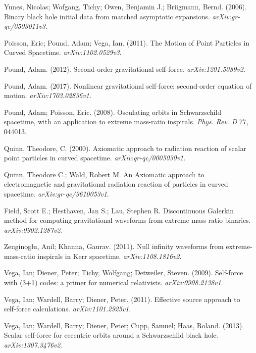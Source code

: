 Yunes, Nicolas; Wofgang, Tichy; Owen, Benjamin J.; Briigmann, Bernd. (2006). Binary black hole initial data from matched asymptotic expansions. {\em arXiv:gr-qc/0503011v3}.

Poisson, Eric; Pound, Adam; Vega, Ian. (2011). The Motion of Point Particles in Curved Spacetime. {\em arXiv:1102.0529v3}.

Pound, Adam. (2012). Second-order gravitational self-force. {\em arXiv:1201.5089v2}.

Pound, Adam. (2017). Nonlinear gravitational self-force: second-order equation of motion. {\em arXiv:1703.02836v1}.

Pound, Adam; Poisson, Eric. (2008). Osculating orbits in Schwarzschild spacetime, with an application to extreme mass-ratio inspirals. {\em Phys. Rev. D} 77, 044013.

Quinn, Theodore, C. (2000). Axiomatic approach to radiation reaction of scalar point particles in curved spacetime. {\em arXiv:qr-qc/0005030v1}.

Quinn, Theodore C.; Wald, Robert M. An Axiomatic approach to electromagnetic and gravitational radiation reaction of particles in curved spacetime. {\em arXiv:gr-qc/9610053v1}.

Field, Scott E.; Hesthaven, Jan S.; Lau, Stephen R. Discontinuous Galerkin method for computing gravitational waveforms from extreme mass ratio binaries. {\em arXiv:0902.1287v2}.

Zenginoglu, Anil; Khanna, Gaurav. (2011). Null infinity waveforms from extreme-mass-ratio inspirals in Kerr spacetime. {\em arXiv:1108.1816v2}.

Vega, Ian; Diener, Peter; Tichy, Wolfgang; Detweiler, Steven. (2009). Self-force with (3+1) codes: a primer for numerical relativists. {\em arXiv:0908.2138v1}.

Vega, Ian; Wardell, Barry; Diener, Peter. (2011). Effective source approach to self-force calculations. {\em arXiv:1101.2925v1}.

Vega, Ian; Wardell, Barry; Diener, Peter; Cupp, Samuel; Haas, Roland. (2013). Scalar self-force for eccentric orbits around a Schwarzschild black hole. {\em arXiv:1307.3476v2}.

